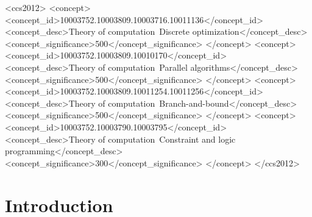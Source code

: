 \documentclass[sigconf]{acmart}
\begin{document}
\begin{CCSXML}
<ccs2012>
<concept>
<concept_id>10003752.10003809.10003716.10011136</concept_id>
<concept_desc>Theory of computation~Discrete optimization</concept_desc>
<concept_significance>500</concept_significance>
</concept>
<concept>
<concept_id>10003752.10003809.10010170</concept_id>
<concept_desc>Theory of computation~Parallel algorithms</concept_desc>
<concept_significance>500</concept_significance>
</concept>
<concept>
<concept_id>10003752.10003809.10011254.10011256</concept_id>
<concept_desc>Theory of computation~Branch-and-bound</concept_desc>
<concept_significance>500</concept_significance>
</concept>
<concept>
<concept_id>10003752.10003790.10003795</concept_id>
<concept_desc>Theory of computation~Constraint and logic programming</concept_desc>
<concept_significance>300</concept_significance>
</concept>
</ccs2012>
\end{CCSXML}



\maketitle

\section{Introduction}
\end{document}
